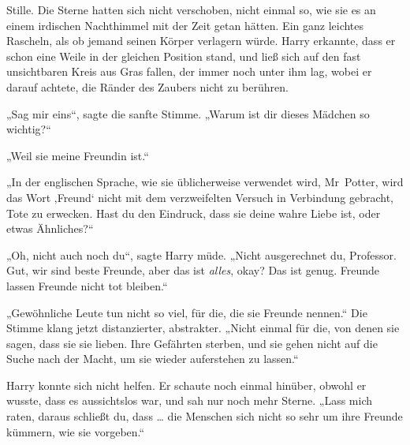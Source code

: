 Stille. Die Sterne hatten sich nicht verschoben, nicht einmal so, wie sie es an einem irdischen Nachthimmel mit der Zeit getan hätten. Ein ganz leichtes Rascheln, als ob jemand seinen Körper verlagern würde. Harry erkannte, dass er schon eine Weile in der gleichen Position stand, und ließ sich auf den fast unsichtbaren Kreis aus Gras fallen, der immer noch unter ihm lag, wobei er darauf achtete, die Ränder des Zaubers nicht zu berühren.

„Sag mir eins“, sagte die sanfte Stimme.
„Warum ist dir dieses Mädchen so wichtig?“

„Weil sie meine Freundin ist.“

„In der englischen Sprache, wie sie üblicherweise verwendet wird, Mr~Potter, wird das Wort ‚Freund‘ nicht mit dem verzweifelten Versuch in Verbindung gebracht, Tote zu erwecken. Hast du den Eindruck, dass sie deine wahre Liebe ist, oder etwas Ähnliches?“

„Oh, nicht auch noch du“, sagte Harry müde.
„Nicht ausgerechnet du, Professor. Gut, wir sind beste Freunde, aber das ist \emph{alles}, okay? Das ist genug. Freunde lassen Freunde nicht tot bleiben.“

„Gewöhnliche Leute tun nicht so viel, für die, die sie Freunde nennen.“ Die Stimme klang jetzt distanzierter, abstrakter.
„Nicht einmal für die, von denen sie sagen, dass sie sie lieben. Ihre Gefährten sterben, und sie gehen nicht auf die Suche nach der Macht, um sie wieder auferstehen zu lassen.“

Harry konnte sich nicht helfen. Er schaute noch einmal hinüber, obwohl er wusste, dass es aussichtslos war, und sah nur noch mehr Sterne.
„Lass mich raten, daraus schließt du, dass … die Menschen sich nicht so sehr um ihre Freunde kümmern, wie sie vorgeben.“


